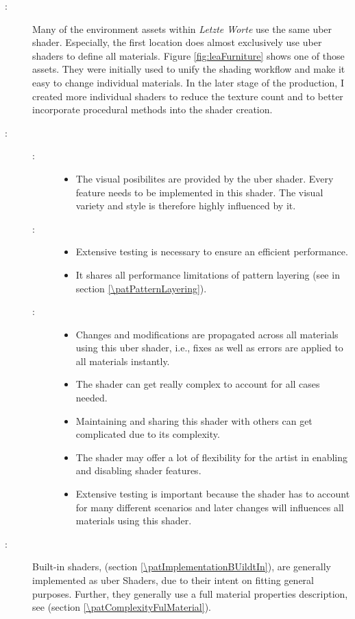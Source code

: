 \begin{description}
	\item[\patExamples:]%
	Many of the environment assets within \emph{Letzte Worte} use the same uber shader. Especially, the first location does almost exclusively use uber shaders to define all materials. Figure \ref{fig:leaFurniture} shows one of those assets. They were initially used to unify the shading workflow and make it easy to change individual materials. In the later stage of the production, I created more individual shaders to reduce the texture count and to better incorporate procedural methods into the shader creation.
	\item[\patConsequences:]%
		\begin{description}
			\item[\visual:]\hfill
				\begin{itemize}\mynobreakpar
					\item The visual posibilites are provided by the uber shader. Every feature needs to be implemented in this shader. The visual variety and style is therefore highly influenced by it.
				\end{itemize}
			\item[\performance:]\hfill
				\begin{itemize}\mynobreakpar
					\item Extensive testing is necessary to ensure an efficient performance. 
					\item It shares all performance limitations of pattern layering (see \emph{\patPatternLayering} in section \ref{\patPatternLayering}).
				\end{itemize}
			\item[\pipeline:]\hfill
				\begin{itemize}\mynobreakpar
					\item Changes and modifications are propagated across all materials using this uber shader, i.e., fixes as well as errors are applied to all materials instantly. 
					\item The shader can get really complex to account for all cases needed. 
					\item Maintaining and sharing this shader with others can get complicated due to its complexity.
					\item The shader may offer a lot of flexibility for the artist in enabling and disabling shader features. 
					\item Extensive testing is important because the shader has to account for many different scenarios and later changes will influences all materials using this shader.
				\end{itemize} 
		\end{description}
	\item[\patRelations:]%
	Built-in shaders, \emph{\patImplementationBUildtIn} (section \ref{\patImplementationBUildtIn}), are generally implemented as uber Shaders, due to their intent on fitting general purposes. Further, they generally use a full material properties description, see \emph{\patComplexityFulMaterial} (section \ref{\patComplexityFulMaterial}). 
\end{description}

